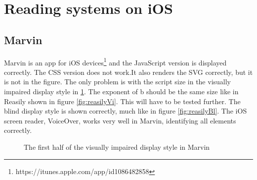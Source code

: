 \section{Reading systems on iOS}
\subsection{Marvin}


Marvin is an app for iOS devices\footnote{https://itunes.apple.com/app/id1086482858} and the JavaScript version is displayed correctly. The CSS version does not work.It also renders the SVG correctly, but it is not in the figure. The only problem is with the script size in the visually impaired display style in \ref{fig:marvinVi}. The exponent of b should be the same size like in Reasily shown in figure \ref{fig:reasilyVi}. This will have to be tested further. The blind display style is shown correctly, much like in figure \ref{fig:reasilyBl}. The iOS screen reader, VoiceOver, works very well in Marvin, identifying all elements correctly.

\begin{figure}[H]
	\centering
	\caption{The first half of the visually impaired display style in Marvin}
	\label{fig:marvinVi}
\end{figure}

